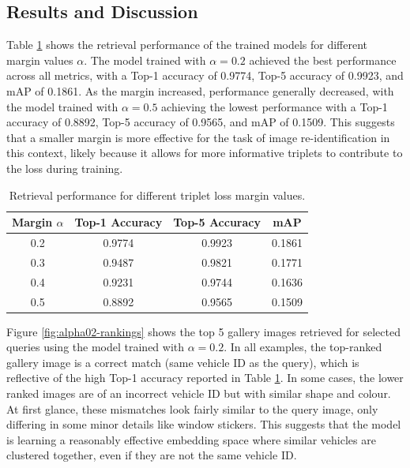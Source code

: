 \documentclass{article}
\theoremstyle{plain}
\theoremstyle{definition}
\theoremstyle{remark}
\begin{document}
\subsection{Results and Discussion}

Table \ref{tab:margin-comparison} shows the retrieval performance of the 
trained models for different margin values $\alpha$. The model trained 
with $\alpha = 0.2$ achieved the best performance across all metrics, 
with a Top-1 accuracy of 0.9774, Top-5 accuracy of 0.9923, and mAP of 0.1861. 
As the margin increased, performance generally decreased, with the model 
trained with $\alpha = 0.5$ achieving the lowest performance with a Top-1 
accuracy of 0.8892, Top-5 accuracy of 0.9565, and mAP of 0.1509. This 
suggests that a smaller margin is more effective for the task of image 
re-identification in this context, likely because it allows for more informative
triplets to contribute to the loss during training. 

\begin{table}[H]
    \centering
    \caption{Retrieval performance for different triplet loss margin values.}
    \label{tab:margin-comparison}
    \begin{tabular}{c c c c}
        \hline
        Margin $\alpha$ & Top-1 Accuracy & Top-5 Accuracy & mAP \\
        \hline
        0.2 & 0.9774 & 0.9923 & 0.1861 \\
        0.3 & 0.9487 & 0.9821 & 0.1771 \\
        0.4 & 0.9231 & 0.9744 & 0.1636 \\
        0.5 & 0.8892 & 0.9565 & 0.1509 \\
        \hline
    \end{tabular}
\end{table}

Figure \ref{fig:alpha02-rankings} shows the top 5 gallery images retrieved for 
selected queries using the model trained with $\alpha = 0.2$. In all examples, 
the top-ranked gallery image is a correct match (same vehicle ID as the query), 
which is reflective of the high Top-1 accuracy reported in Table \ref{tab:margin-comparison}. 
In some cases, the lower ranked images are of an incorrect vehicle ID but with 
similar shape and colour. At first glance, these mismatches look fairly similar 
to the query image, only differing in some minor details like window stickers. 
This suggests that the model is learning a reasonably effective embedding space 
where similar vehicles are clustered together, even if they are not the same vehicle ID.
\end{document}
